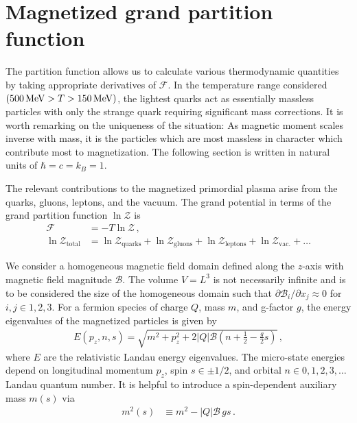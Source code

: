 \documentclass[epjST]{svjour}
\newcommand*{\MeV}{\text{\,MeV}}
\begin{document}
\section{Magnetized grand partition function}
\label{sec:partition}
The partition function allows us to calculate various thermodynamic quantities by taking appropriate derivatives of $\mathcal{F}$. In the temperature range considered $(500\MeV>T>150\MeV)$, the lightest quarks act as essentially massless particles with only the strange quark requiring significant mass corrections. It is worth remarking on the uniqueness of the situation: As magnetic moment scales inverse with mass, it is the particles which are most massless in character which contribute most to magnetization. The following section is written in natural units of \(\hbar=c=k_{B}=1\).

The relevant contributions to the magnetized primordial plasma arise from the quarks, gluons, leptons, and the vacuum. The grand potential in terms of the grand partition function $\ln\mathcal{Z}$ is
\begin{align}
    \label{eq:parts}
    \mathcal{F} &= -T\ln\mathcal{Z}\,,\\
    \ln\mathcal{Z}_{\mathrm{total}} &=
    \ln\mathcal{Z}_{\mathrm{quarks}} +
    \ln\mathcal{Z}_{\mathrm{gluons}} +
    \ln\mathcal{Z}_{\mathrm{leptons}}+
    \ln\mathcal{Z}_{\mathrm{vac.}}+\ldots 
\end{align}

We consider a homogeneous magnetic field domain defined along the $z$-axis with magnetic field magnitude $\mathcal{B}$. The volume $V=L^{3}$ is not necessarily infinite and is to be considered the size of the homogeneous domain such that $\partial\mathcal{B}_{i}/\partial x_{j}\approx0$ for \(i,j \in {1,2,3}\). For a fermion species of charge $Q$, mass $m$, and g-factor $g$, the energy eigenvalues of the magnetized particles is given by~\cite{Steinmetz:2018ryf}
\begin{align}
    \label{eq:energystates}
    E(p_{z},n,s)=\sqrt{m^{2}+p_{z}^{2}+2|Q|\mathcal{B}\left(n+\frac{1}{2}-\frac{g}{2}s\right)}\,,
\end{align}
where $E$ are the relativistic Landau energy eigenvalues. The micro-state energies depend on longitudinal momentum \(p_{z}\), spin $s\in\pm1/2$, and orbital $n\in0,1,2,3,\ldots$ Landau quantum number. It is helpful to introduce a spin-dependent auxiliary mass $m(s)$ via
\begin{align}
    \label{eq:spinmass}
    m^{2}(s) &\equiv m^{2} - |Q|\mathcal{B}\,g s\,.
\end{align}
\end{document}

